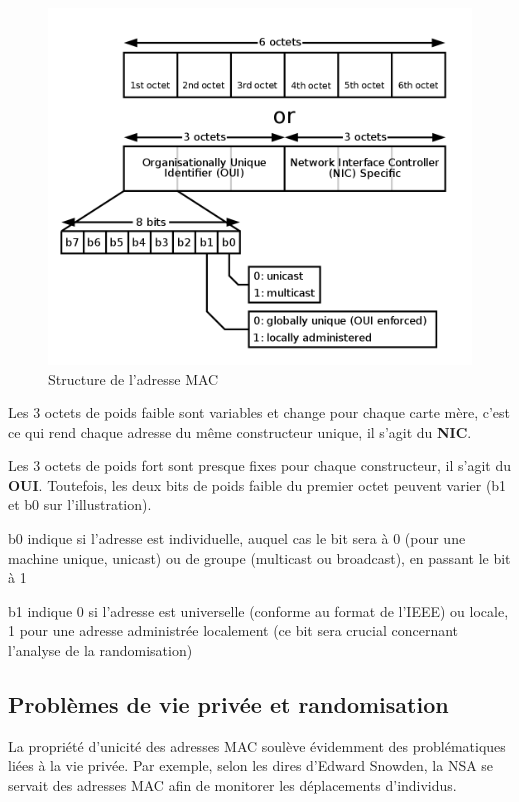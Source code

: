 \begin{figure}[H]
	\centering
	\includegraphics[width=12cm]{images/probe/mac_struc.png}
	\caption{Structure de l'adresse MAC}
	\label{fig:macstruct}
\end{figure}

Les 3 octets de poids faible sont variables et change pour chaque carte mère, c'est ce qui rend chaque adresse du même
constructeur unique, il s'agit du \textbf{NIC}.

Les 3 octets de poids fort sont presque fixes pour chaque constructeur, il s'agit du \textbf{OUI}.
Toutefois, les deux bits de poids faible du premier octet peuvent varier (b1 et b0 sur l'illustration).

b0 indique si l'adresse est individuelle, auquel cas le bit sera à 0 (pour une machine unique, unicast) 
ou de groupe (multicast ou broadcast), en passant le bit à 1

b1 indique 0 si l'adresse est universelle (conforme au format de l'IEEE) ou 
locale, 1 pour une adresse administrée localement (ce bit sera crucial concernant l'analyse de la randomisation)

\subsection{Problèmes de vie privée et randomisation}
La propriété d'unicité des adresses MAC soulève évidemment des problématiques liées à la vie privée. 
Par exemple, selon les dires d'Edward Snowden, la NSA se servait des adresses MAC afin de
monitorer les déplacements d'individus.~\cite{hackernews:snowdan}


